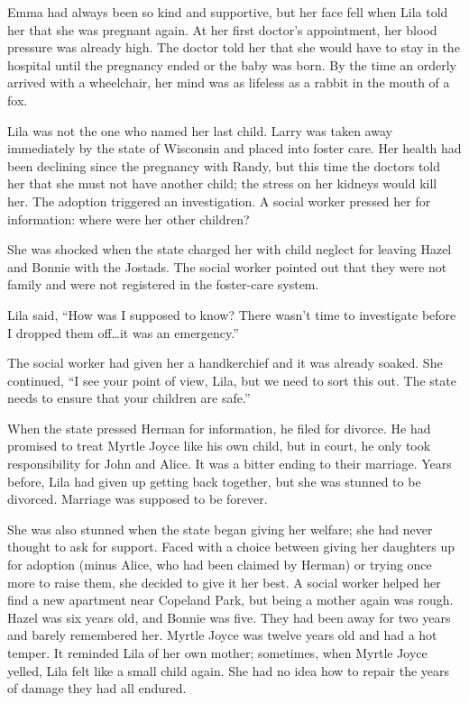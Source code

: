 \documentclass[
  american,
  letterpaper,
]{book}
\begin{document}
Emma had always been so kind and supportive, but her face fell when Lila
told her that she was pregnant again. At her first doctor's appointment,
her blood pressure was already high. The doctor told her that she would
have to stay in the hospital until the pregnancy ended or the baby was
born. By the time an orderly arrived with a wheelchair, her mind was as
lifeless as a rabbit in the mouth of a fox.

Lila was not the one who named her last child. Larry was taken away
immediately by the state of Wisconsin and placed into foster care. Her
health had been declining since the pregnancy with Randy, but this time
the doctors told her that she must not have another child; the stress on
her kidneys would kill her. The adoption triggered an investigation. A
social worker pressed her for information: where were her other
children?

She was shocked when the state charged her with child neglect for
leaving Hazel and Bonnie with the Jostads. The social worker pointed out
that they were not family and were not registered in the foster-care
system.

Lila said, ``How was I supposed to know? There wasn't time to
investigate before I dropped them off\ldots it was an emergency.''

The social worker had given her a handkerchief and it was already
soaked. She continued, ``I see your point of view, Lila, but we need to
sort this out. The state needs to ensure that your children are safe.''

When the state pressed Herman for information, he filed for divorce. He
had promised to treat Myrtle Joyce like his own child, but in court, he
only took responsibility for John and Alice. It was a bitter ending to
their marriage. Years before, Lila had given up getting back together,
but she was stunned to be divorced. Marriage was supposed to be forever.

She was also stunned when the state began giving her welfare; she had
never thought to ask for support. Faced with a choice between giving her
daughters up for adoption (minus Alice, who had been claimed by Herman)
or trying once more to raise them, she decided to give it her best. A
social worker helped her find a new apartment near Copeland Park, but
being a mother again was rough. Hazel was six years old, and Bonnie was
five. They had been away for two years and barely remembered her. Myrtle
Joyce was twelve years old and had a hot temper. It reminded Lila of her
own mother; sometimes, when Myrtle Joyce yelled, Lila felt like a small
child again. She had no idea how to repair the years of damage they had
all endured.
\end{document}
